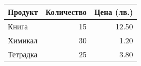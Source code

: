 \begin{tabular}{lrr}
\toprule
Продукт & Количество & Цена (лв.) \\
\midrule
Книга & 15 & 12.50 \\
Химикал & 30 & 1.20 \\
Тетрадка & 25 & 3.80 \\
\bottomrule
\end{tabular}
